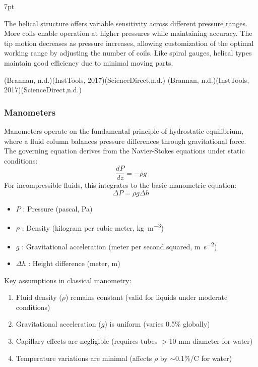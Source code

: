 \documentclass{article}
\newcommand{\formalsource}{} %
\newenvironment{formal}[3][]{%
	\renewcommand{\formalsource}{#1}%
	\def\FrameCommand{%
		\hspace{1pt}%
		{\color{#2}\vrule width 2pt}%
		{\color{#3}\vrule width 4pt}%
		\colorbox{#3}%
	}%
	\MakeFramed{\advance\hsize-\width\FrameRestore}%
	\noindent\hspace{-4.55pt}%
	\begin{adjustwidth}{}{7pt}%
		\vspace{2pt}%
	}%
	{%
		\vspace{4pt}%
		\ifx\formalsource\empty %
		\else
		\hfill{\footnotesize{\formalsource}}%
		\fi
	\end{adjustwidth}\endMakeFramed%
}
\newcommand{\wm}[2]{%
	\begin{minipage}{#1\textwidth}
		\centering
		#2
	\end{minipage}%
}
\begin{document}
\begin{formal}[(Brannan, n.d.)(InstTools, 2017)(ScienceDirect,n.d.)]{black!50!white}{white!97!gray}
\begin{itemize}
	The helical structure offers variable sensitivity across different pressure ranges. More coils enable operation at higher pressures while maintaining accuracy. The tip motion decreases as pressure increases, allowing customization of the optimal working range by adjusting the number of coils. Like spiral gauges, helical types maintain good efficiency due to minimal moving parts.
\end{itemize}
\end{formal}

\vspace{1em}
\subsubsection{Manometers}	

Manometers operate on the fundamental principle of hydrostatic equilibrium, where a fluid column balances pressure differences through gravitational force. The governing equation derives from the Navier-Stokes equations under static conditions:
\begin{equation}
	\frac{dP}{dz} = -\rho g
\end{equation}
\noindent 
For incompressible fluids, this integrates to the basic manometric equation:
\begin{equation}
	\Delta P = \rho g \Delta h
\end{equation}
\begin{center}
\hspace{10em}\wm{0.7}{\centering
	\begin{itemize}[itemsep=-1mm,leftmargin=0cm]
		\item $P$ : Pressure (pascal, \si{\Pa})  
		\item $\rho$ : Density (kilogram per cubic meter, \si{\kg\per\m\cubed})  
		\item $g$ : Gravitational acceleration (meter per second squared, \si{\m\per\s\squared})  
		\item $\Delta h$ : Height difference (meter, \si{\m})
	\end{itemize}}
\end{center}
Key assumptions in classical manometry:
\begin{enumerate}
	\item Fluid density ($\rho$) remains constant (valid for liquids under moderate conditions)
	\item Gravitational acceleration ($g$) is uniform (varies 0.5\% globally)
	\item Capillary effects are negligible (requires tubes $>$10 mm diameter for water)
	\item Temperature variations are minimal (affects $\rho$ by $\sim$0.1\%/\textdegree C for water)
\end{enumerate}
\end{document}
